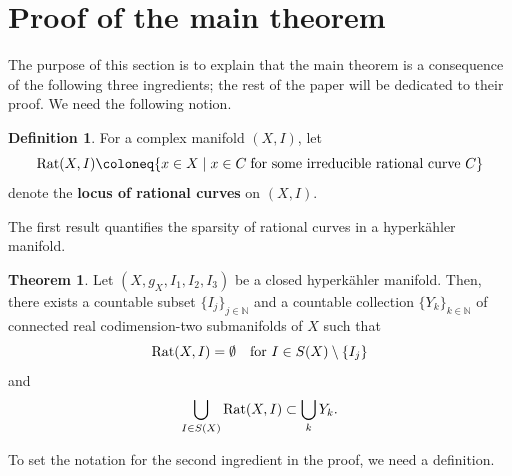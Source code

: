 \documentclass[11pt,a4paper]{article}
\theoremstyle{definition}
\newtheorem{definition}[theorem]{Definition}
\newtheorem{ingredient}{Theorem}
\newcommand{\Rat}{\textnormal{Rat}}
\newcommand{\bN}{\mathbb{N}}
\begin{document}
\section{Proof of the main theorem}\label{Proof of the main theorem}

The purpose of this section is to explain that the main theorem is a consequence of the following three ingredients; the rest of the paper will be dedicated to their proof. We need the following notion.

\begin{definition}
    For a complex manifold $(X, I)$, let 
    \begin{equation*}
        \Rat(X, I) \coloneq \{ x \in X \; | \; x\in C \; \text{for some irreducible rational curve } C\} 
    \end{equation*}
    denote the \textbf{locus of rational curves} on $(X, I)$.
\end{definition}

The first result quantifies the sparsity of rational curves in a hyperkähler manifold.

\begin{ingredient}\label{thm:A}
    Let $(X, g_X, I_1, I_2, I_3)$ be a closed hyperkähler manifold. Then, there exists a countable subset $\{ I_j \}_{j \in \bN}$ and a countable collection $\{Y_k\}_{k \in \bN}$ of connected real codimension-two submanifolds of $X$ such that
    \begin{equation*}
       \Rat(X, I)=\emptyset \quad \text{for } I \in S(X) \setminus  \{ I_j \}
    \end{equation*}
    and 
    \begin{equation*}
        \bigcup_{I \in S(X)} \Rat(X, I) \subset \bigcup_{k} Y_k.
    \end{equation*}
\end{ingredient}

To set the notation for the second ingredient in the proof, we need a definition.
\end{document}
